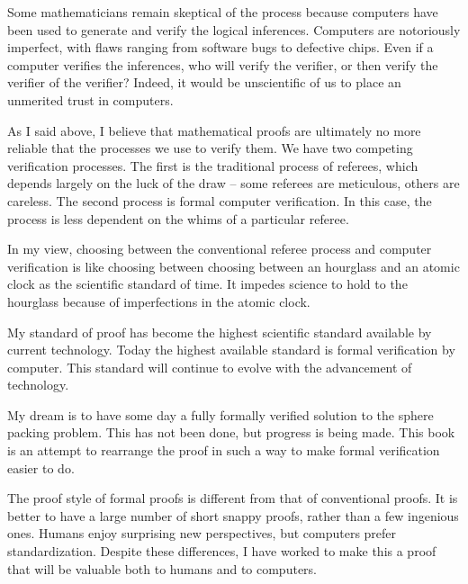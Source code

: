 Some mathematicians remain skeptical of the process because
computers have been used to generate and verify the logical
inferences.  Computers are notoriously imperfect, with flaws ranging
from software bugs to defective chips.  Even if a computer verifies
the inferences, who will verify the verifier, or then verify the
verifier of the verifier?  Indeed, it would be unscientific of us to
place an unmerited trust in computers.

As I said above, I believe that mathematical proofs are ultimately
no more reliable that the processes we use to verify them.  We have
two competing verification processes.  The first is the traditional
process of referees, which depends largely on the luck of the draw
-- some referees are meticulous, others are careless.   The second
process is formal computer verification. In this case, the process
is less dependent on the whims of a particular referee.

In my view, choosing between the conventional referee process and
computer verification is like choosing between choosing between an
hourglass and an atomic clock as the scientific standard of time. It
impedes science to hold to the hourglass because of imperfections in
the atomic clock.

My standard of proof has become the highest scientific standard
available by current technology.  Today the highest available
standard is formal verification by computer.  This standard will
continue to evolve with the advancement of technology.

My dream is to have some day a fully formally verified solution to
the sphere packing problem.
This has not been done, but progress is being
made.  This book is an attempt to rearrange the proof
in such a way to make formal verification easier to do.

The proof style of formal proofs is different from that of
conventional proofs.  It is better to have a large number of short
snappy proofs, rather than a few ingenious ones.  Humans enjoy
surprising new perspectives, but computers prefer standardization.
Despite these differences, I have worked to make this a proof that
will be valuable both to humans and to computers.
